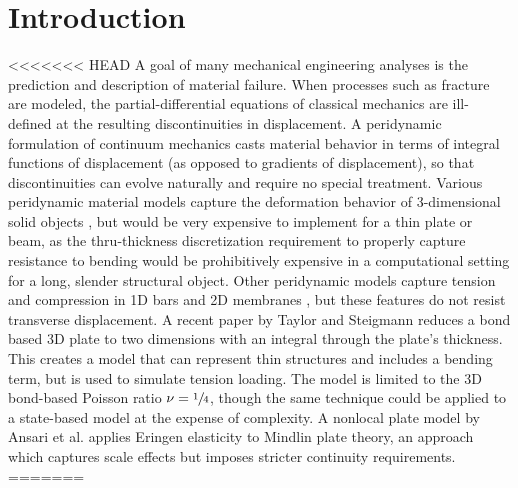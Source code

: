 \documentclass[preprint,review,12pt]{elsarticle}
\begin{document}
\section{Introduction}
<<<<<<< HEAD
 A goal of many mechanical engineering analyses is the prediction and description of material failure.  When processes such as fracture are modeled, the partial-differential equations of classical mechanics are ill-defined at the resulting discontinuities in displacement.  A peridynamic formulation of continuum mechanics casts material behavior in terms of integral functions of displacement (as opposed to gradients of displacement), so that discontinuities can evolve naturally and require no special treatment.  Various peridynamic material models capture the deformation behavior of 3-dimensional solid objects \cite{silling2007peridynamic, silling2005meshfree, gerstle2007peridynamic}, but would be very expensive to implement for a thin plate or beam, as the thru-thickness discretization requirement to properly capture resistance to bending would be prohibitively expensive in a computational setting for a long, slender structural object.  Other peridynamic models capture tension and compression in 1D bars \cite{silling2003deformation} and 2D membranes \cite{silling2005peridynamic}, but these features do not resist transverse displacement.  A recent paper by Taylor and Steigmann \cite{taylor2013two} reduces a bond based 3D plate to two dimensions with an integral through the plate's thickness.  This creates a model that can represent thin structures and includes a bending term, but is used to simulate tension loading.  The model is limited to the 3D bond-based Poisson ratio \(\nu=\sfrac{1}{4}\), though the same technique could be applied to a state-based model at the expense of complexity.
A nonlocal plate model by Ansari et al. \cite{ansari2010nonlocal} applies Eringen elasticity to Mindlin plate theory, an approach which captures scale effects but imposes stricter continuity requirements.
=======
\end{document}

